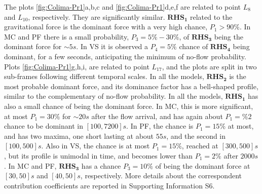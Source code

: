 \documentclass{article}
\begin{document}
The plots \ref{fig:Colima-Pr1}a,b,c and \ref{fig:Colima-Pr1}d,e,f are related to point $L_8$ and $L_{10}$, respectively. They are significantly similar. $\boldsymbol{RHS_1}$ related to the gravitational force is the dominant force with a very high chance, $P_1>90\%$. In MC and PF there is a small probability, $P_3=5\%-30\%$, of $\boldsymbol{RHS_3}$ being the dominant force for $\sim 5 s$. In VS it is observed a $P_4=5\%$ chance of $\boldsymbol{RHS_4}$ being dominant, for a few seconds, anticipating the minimum of no-flow probability. Plots \ref{fig:Colima-Pr1}g,h,i, are related to point $L_{17}$, and the plots are split in two sub-frames following different temporal scales. In all the models, $\boldsymbol{RHS_2}$ is the most probable dominant force, and its dominance factor has a bell-shaped profile, similar to the complementary of no-flow probability. In all the models, $\boldsymbol{RHS_1}$ has also a small chance of being the dominant force. In MC, this is more significant, at most $P_1=30\%$ for $\sim 20 s$ after the flow arrival, and has again about $P_1=\%2$ chance to be dominant in $[100, 7200] s$. In PF, the chance is $P_1=15\%$ at most, and has two maxima, one short lasting at about $55 s$, and the second in $[100,500] s$. Also in VS, the chance is at most $P_1=15\%$, reached at $[300, 500] s$, but its profile is unimodal in time, and becomes lower than $P_1=2\%$ after $2000 s$. In MC and PF, $\boldsymbol{RHS_3}$ has a chance $P_3=10\%$ of being the dominant force at $[30, 50] s$ and $[40, 50] s$, respectively. More details about the correspondent contribution coefficients are reported in Supporting Information S6.
\end{document}
